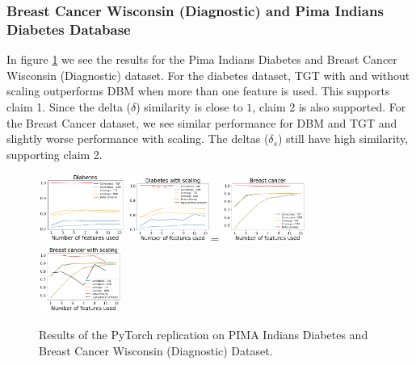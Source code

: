 \subsubsection{Breast Cancer Wisconsin (Diagnostic) and Pima Indians Diabetes Database}
In figure \ref{fig:pt_diabetes_breast} we see the results for the Pima Indians Diabetes and Breast Cancer Wisconsin (Diagnostic) dataset. For the diabetes dataset, TGT with and without scaling outperforms DBM when more than one feature is used. This supports claim 1. Since the delta ($\delta$) similarity is close to $1$, claim 2 is also supported. For the Breast Cancer dataset, we see similar performance for DBM and TGT and slightly worse performance with scaling. The deltas ($\delta_s$) still have high similarity, supporting claim 2. 

\begin{figure}[H]
    \includegraphics[width=0.25\textwidth]{../openreview/images/ptfigures/diabetes-tradeoff.png}
    \includegraphics[width=0.24\textwidth]{../openreview/images/ptfigures/diabetes_scaling-tradeoff.png}=
    \includegraphics[width=0.24\textwidth]{../openreview/images/ptfigures/breast-tradeoff.png}
    \includegraphics[width=0.24\textwidth]{../openreview/images/ptfigures/breastscaling-tradeoff.png}
    \caption{Results of the PyTorch replication on PIMA Indians Diabetes and Breast Cancer Wisconsin (Diagnostic) Dataset.}
    \label{fig:pt_diabetes_breast}
\end{figure}

